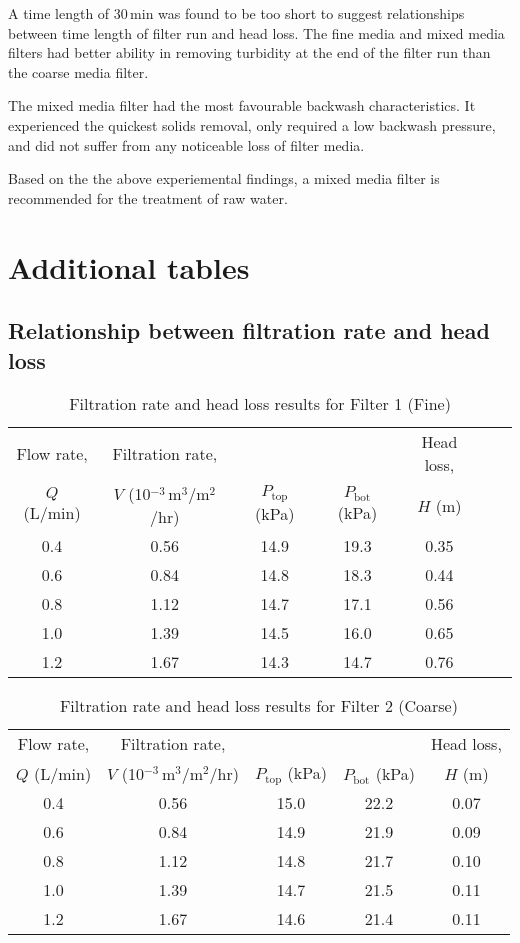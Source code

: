 \documentclass{article}
\begin{document}
A time length of 30\,min was found to be too short to suggest relationships
between time length of filter run and head loss.
The fine media and mixed media filters had better ability in removing turbidity at the end
of the filter run than the coarse media filter.

The mixed media filter had the most favourable backwash characteristics. 
It experienced the quickest solids removal, only required a low backwash 
pressure, and did not suffer from any noticeable loss of filter media.

Based on the the above experiemental findings, a mixed media filter is recommended 
for the treatment of raw water.



\clearpage
\appendix
\section{Additional tables}
\vfill
\subsection{Relationship between filtration rate and head loss}
\label{app:tables_H_V}
\begin{table}[htbp]
\centering
\begin{tabular}{ccccccc} \toprule
Flow rate, & Filtration rate, &  &  & Head loss, \\ 
$Q$ (L/min) & $V$ (10$^{-3}$\,m$^3$/m$^2$/hr) & $P_\text{top}$ (kPa) & $P_\text{bot}$ (kPa) & $H$ (m) \\ \midrule
0.4 & 0.56 & 14.9 & 19.3 & 0.35 \\ 
0.6 & 0.84 & 14.8 & 18.3 & 0.44 \\ 
0.8 & 1.12 & 14.7 & 17.1 & 0.56 \\ 
1.0 & 1.39 & 14.5 & 16.0 & 0.65 \\ 
1.2 & 1.67 & 14.3 & 14.7 & 0.76 \\ \bottomrule
\end{tabular}
\caption{Filtration rate and head loss results for Filter 1 (Fine)}
\label{tab:H_V_filter1}
\end{table}

\vfill
\begin{table}[htbp]
\centering
\begin{tabular}{ccccc} \toprule
Flow rate, & Filtration rate, &  &  & Head loss, \\ 
$Q$ (L/min) & $V$ (10$^{-3}$\,m$^3$/m$^2$/hr) & $P_\text{top}$ (kPa) & $P_\text{bot}$ (kPa) & $H$ (m) \\ \midrule
0.4 & 0.56 & 15.0 & 22.2 & 0.07 \\ 
0.6 & 0.84 & 14.9 & 21.9 & 0.09 \\ 
0.8 & 1.12 & 14.8 & 21.7 & 0.10 \\ 
1.0 & 1.39 & 14.7 & 21.5 & 0.11 \\ 
1.2 & 1.67 & 14.6 & 21.4 & 0.11 \\ \bottomrule
\end{tabular}
\caption{Filtration rate and head loss results for Filter 2 (Coarse)}
\label{tab:H_V_filter2}
\end{table}
\end{document}
